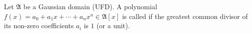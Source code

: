 Let $\mathfrak{A}$ be a Gaussian domain (UFD). A polynomial $f(x) = a_0 + a_1x + \cdots + a_nx^n \in \mathfrak{A}[x]$ is called  if the greatest common divisor of its non-zero coefficients $a_i$ is $1$ (or a unit).
